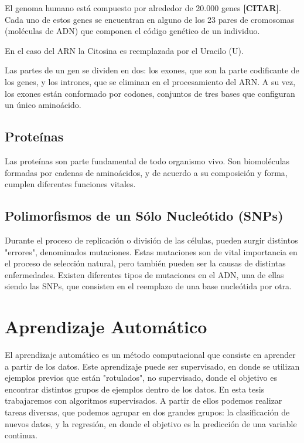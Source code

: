El genoma humano está compuesto por alrededor de 20.000 genes \textbf{[CITAR]}. Cada uno de estos genes se encuentran en alguno de los 23 pares de cromosomas (moléculas de ADN) que componen el código genético de un individuo. 



En el caso del ARN la Citosina es reemplazada por el Uracilo (U).

Las partes de un gen se dividen en dos: los exones, que son la parte codificante de los genes, y los intrones, que se eliminan en el procesamiento del ARN. 
A su vez, los exones están conformado por codones, conjuntos de tres bases que configuran un único aminoácido. 


\subsection{Proteínas}

Las proteínas son parte fundamental de todo organismo vivo. Son biomoléculas formadas por cadenas de aminoácidos, y de acuerdo a su composición y forma, cumplen diferentes funciones vitales.

\subsection{Polimorfismos de un Sólo Nucleótido (SNPs)}

Durante el proceso de replicación o división de las células, pueden surgir distintos "errores", denominados mutaciones. Estas mutaciones son de vital importancia en el proceso de selección natural, pero también pueden ser la causas de distintas enfermedades. Existen diferentes tipos de mutaciones en el ADN, una de ellas siendo las SNPs, que consisten en el reemplazo de una base nucleótida por otra.


\section{Aprendizaje Automático}

El aprendizaje automático es un método computacional que consiste en aprender a partir de los datos. Este aprendizaje puede ser supervisado, en donde se utilizan ejemplos previos que están "rotulados", no supervisado, donde el objetivo es encontrar distintos grupos de ejemplos dentro de los datos. En esta tesis trabajaremos con algoritmos supervisados. A partir de ellos podemos realizar tareas diversas, que podemos agrupar en dos grandes grupos: la clasificación de nuevos datos, y la regresión, en donde el objetivo es la predicción de una variable continua. 

